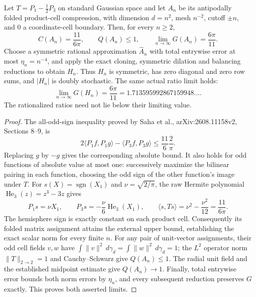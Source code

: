\begin{proposition}
\label{prop:saha-exact-benchmark}
Let $T=P_1-\frac12P_3$ on standard Gaussian space and let $A_n$
be its antipodally folded product-cell compression, with dimension
$d=n^2$, mesh $n^{-2}$, cutoff $\pm n$, and $0$ a coordinate-cell
boundary.  Then, for every $n\geq2$,
\[
 C(A_n)=\frac{11}{6\pi},\qquad Q(A_n)\leq1,
 \qquad \lim_{n\to\infty}G(A_n)=\frac{6\pi}{11}.
\]
Choose a symmetric rational approximation $\widehat A_n$ with total
entrywise error at most $\eta_n=n^{-4}$, and apply the exact cloning,
symmetric dilation and balancing reductions to obtain $H_n$.
Thus $H_n$ is symmetric, has zero diagonal and zero row sums, and
$|H_n|$ is doubly stochastic.  The same actual ratio limit holds:
\[
 \lim_{n\to\infty}G(H_n)=\frac{6\pi}{11}
 =1.713595992867159948\ldots.
\]
The rationalized ratios need not lie below their limiting value.
\end{proposition}
\begin{proof}
The all-odd-sign inequality proved by Saha et al.,
arXiv:2608.11158v2, Sections 8--9, is
\[
 2\langle P_1f,P_1g\rangle-\langle P_3f,P_3g\rangle
 \leq\frac{11}{6}\frac2\pi.
\]
Replacing $g$ by $-g$ gives the corresponding absolute bound.
It also holds for odd functions of absolute value at most one:
successively maximize the bilinear pairing in each function, choosing
the odd sign of the other function's image under $T$.
For $s(X)=\operatorname{sgn}(X_1)$ and
$\nu=\sqrt{2/\pi}$, the raw Hermite polynomial
$\operatorname{He}_3(z)=z^3-3z$ gives
\[
 P_1s=\nu X_1,\qquad P_3s=-\frac\nu6
 \operatorname{He}_3(X_1),\qquad
 \langle s,Ts\rangle=\nu^2-\frac{\nu^2}{12}
 =\frac{11}{6\pi}.
\]
The hemisphere sign is exactly constant on each product cell.
Consequently its folded matrix assignment attains the external upper
bound, establishing the exact scalar norm for every finite $n$.
For any pair of unit-vector assignments, their odd cell fields $v,w$
have $\int\|v\|^2\,d\gamma_d=\int\|w\|^2\,d\gamma_d=1$;
the $L^2$ operator norm $\|T\|_{2\to2}=1$ and Cauchy--Schwarz give
$Q(A_n)\leq1$.
The radial unit field and the established midpoint estimate give
$Q(A_n)\to1$.
Finally, total entrywise error bounds both norm errors by $\eta_n$,
and every subsequent reduction preserves $G$ exactly.  This proves
both asserted limits.
\end{proof}

